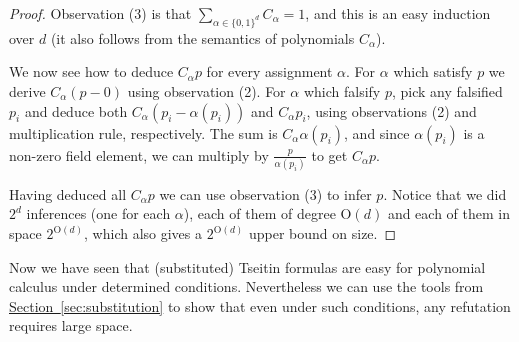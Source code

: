 \documentclass[11pt]{article}
\numberwithin{equation}{section}
\theoremstyle{definition}
\theoremstyle{plain}
\newcommand{\expref}[2]{\hyperref[#2]{#1~\ref{#2}}}
\theoremstyle{plain}
\theoremstyle{definition}
\newcommand{\bigoh}[1]{\mathrm{O} ( #1 )}
\begin{document}
\begin{proof}
Observation (3) is that $\sum_{\alpha\in\{0,1\}^{d}} C_{\alpha} = 1$,
and this is an easy induction over $d$ (it also follows from the
semantics of polynomials $C_\alpha$).

We now see how to deduce $C_{\alpha} p$ for every assignment $\alpha$.
%
For $\alpha$ which satisfy $p$ we derive $C_{\alpha}(p - 0)$ using observation (2).
%
For $\alpha$ which falsify $p$, pick any falsified $p_{i}$ and deduce
both $C_{\alpha} (p_{i}-\alpha(p_{i}))$ and $C_{\alpha}p_{i}$, using
observations (2) and multiplication rule, respectively. The sum is
$C_{\alpha}\alpha(p_{i})$, and since $\alpha(p_{i})$ is a non-zero
field element, we
can multiply by $\frac{p}{\alpha(p_{i})}$ to get $C_{\alpha}p$.
%

Having deduced all $C_{\alpha}p$ we can use observation (3) to infer $p$.
%
Notice that we did $2^{d}$ inferences (one for each $\alpha$), each of them of degree $\bigoh{d}$ and each of them in space $2^{\bigoh{d}}$, which also gives
%
a $2^{\bigoh{d}}$ upper bound %
on size.
\end{proof}

Now we have seen that (substituted) Tseitin formulas are easy for
polynomial calculus under determined conditions. Nevertheless we can
use the tools from \expref{Section}{sec:substitution} to show that even
under such conditions, any refutation requires large space.
\end{document}
